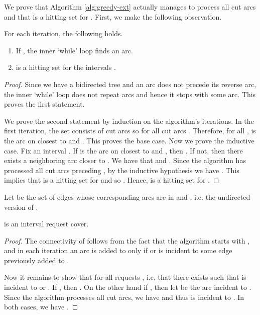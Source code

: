We prove that Algorithm \ref{alg:greedy-ext} actually manages to
process all cut arcs  and that  is a hitting set for
. First, we make the following observation.

\begin{lemma}
  \label{lem:invariants}
  For each iteration, the following holds.
  \begin{enumerate}
  \item If , the inner `while' loop finds an arc.
  \item  is
    a hitting set for the intervals .
  \end{enumerate}
\end{lemma}

\begin{proof}
  Since we have a bidirected tree and an arc does not precede its
  reverse arc, the inner `while' loop does not repeat arcs and hence it stops with
  some arc. This proves the first statement.


  We prove the second statement by induction on the algorithm's
  iterations. In the first iteration, the set  consists of cut arcs
  so  for all cut arcs . Therefore, for all
  ,  is the arc on  closest to
   and . This proves the base case. Now we prove the
  inductive case.
Fix an interval . If  is the arc
  on  closest to  and , then . If not, then there exists a neighboring arc  closer to . We have that
   and . Since the
  algorithm has processed all cut arcs preceding , by the inductive
  hypothesis we have . This
  implies that  is a hitting set for  and
  so .
  Hence,  is a hitting set for .  \end{proof}



Let  be the set of edges whose corresponding arcs are in 
and , i.e. the undirected version of
.
\begin{lemma}
  \label{lem:connected}
   is an interval request cover.
\end{lemma}

\begin{proof}
The connectivity of  follows from the fact that the
  algorithm starts with , and in each iteration an
  arc  is added to  only if  or  is
  incident to some edge previously added to .

  Now it remains to show that  for all
  requests , i.e. that there exists  such that
   is incident to  or . If , then
  . On the other hand if
  , then let  be the arc
  incident to . Since the algorithm processes all cut arcs, we have  and thus  is incident to
  . In both cases, we have
  .  \end{proof}


